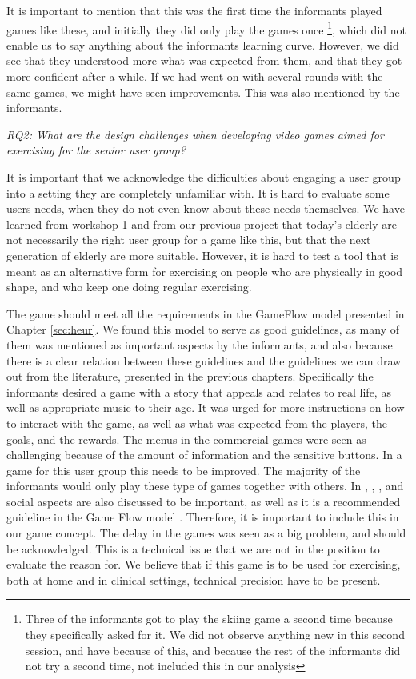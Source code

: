 It is important to mention that this was the first time the informants played games like these, and initially they did only play the games once \footnote{Three of the informants got to play the skiing game a second time because they specifically asked for it. We did not observe anything new in this second session, and have because of this, and because the rest of the informants did not try a second time, not included this in our analysis}, which did not enable us to say anything about the informants learning curve. However, we did see that they understood more what was expected from them, and that they got more confident after a while. If we had went on with several rounds with the same games, we might have seen improvements. This was also mentioned by the informants. 

\emph{RQ2: What are the design challenges when developing video games aimed for exercising for the senior user group?}

It is important that we acknowledge the difficulties about engaging a user group into a setting they are completely unfamiliar with. It is hard to evaluate some users needs, when they do not even know about these needs themselves. We have learned from workshop 1 and from our previous project that today's elderly are not necessarily the right user group for a game like this, but that the next generation of elderly are more suitable. However, it is hard to test a tool that is meant as an alternative form for exercising on people who are physically in good shape, and who keep one doing regular exercising. 

The game should meet all the requirements in the GameFlow model \cite{sweetser} presented in Chapter \ref{sec:heur}. We found this model to serve as good guidelines, as many of them was mentioned as important aspects by the informants, and also because there is a clear relation between these guidelines and the guidelines we can draw out from the literature, presented in the previous chapters. Specifically the informants desired a game with a story that appeals and relates to real life, as well as appropriate music to their age. It was urged for more instructions on how to interact with the game, as well as what was expected from the players, the goals, and the rewards. The menus in the commercial games were seen as challenging because of the amount of information and the sensitive buttons. In a game for this user group this needs to be improved. The majority of the informants would only play these type of games together with others. In \cite{chao}, \cite{statistics2012}, \cite{Billis}, \cite{gerling2} and \cite{gerling1} social aspects are also discussed to be important, as well as it is a recommended guideline in the Game Flow model \cite{sweetser}. Therefore, it is important to include this in our game concept. The delay in the games was seen as a big problem, and should be acknowledged.  This is a technical issue that we are not in the position to evaluate the reason for. We believe that if this game is to be used for exercising, both at home and in clinical settings, technical precision have to be present. 
 


